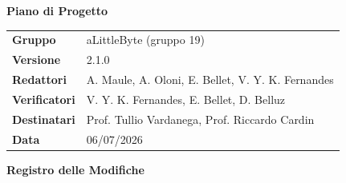 \documentclass[a4paper,12pt]{article}
\begin{document}
\thispagestyle{firstpage}

\vspace*{0.5cm}

\begin{center}
    {\LARGE \textbf{Piano di Progetto}}
\end{center}

\vspace{1.5cm}

\begin{center}
    \renewcommand{\arraystretch}{1.3}
    \begin{tcolorbox}[
        width=0.92\textwidth,
        colback=gray!6,
        colframe=gray!45,
        boxrule=0.5pt,
        arc=2mm,
        boxsep=0pt,
        left=8pt, right=8pt, top=8pt, bottom=8pt
    ]
        \begin{tabularx}{\linewidth}{>{\bfseries}p{3.5cm} X}
            Gruppo      & aLittleByte (gruppo 19) \\
            Versione & 2.1.0 \\
            Redattori   & A. Maule, A. Oloni, E. Bellet, V. Y. K. Fernandes \\
            Verificatori &  V. Y. K. Fernandes, E. Bellet, D. Belluz \\
            Destinatari & Prof. Tullio Vardanega, Prof. Riccardo Cardin \\
            Data        & 06/07/2026
        \end{tabularx}
    \end{tcolorbox}
\end{center}

\newpage
{}

\begin{center}
    {\Large \textbf{Registro delle Modifiche}}
\end{center}

\vspace{0.35cm}
\renewcommand{\arraystretch}{1.35}
\end{document}
